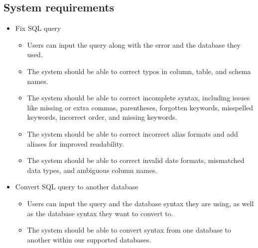     \subsection{System requirements}
    \begin{itemize}
        \item  Fix SQL query
        \begin{itemize}
            \item Users can input the query along with the error and the database they used.
            \item The system should be able to correct typos in column, table, and schema names. 
            \item The system should be able to correct incomplete syntax, including issues like missing or extra commas, parentheses, forgotten keywords, misspelled keywords, incorrect order, and missing keywords. 
            \item The system should be able to correct incorrect alias formats and add aliases for improved readability. 
            \item The system should be able to correct invalid date formats, mismatched data types, and ambiguous column names.
        \end{itemize}

        \item  Convert SQL query to another database
        \begin{itemize}
            \item Users can input the query and the database syntax they are using, as well as the database syntax they want to convert to.
            \item The system should be able to convert syntax from one database to another within our supported databases.
        \end{itemize}


\end{itemize}
